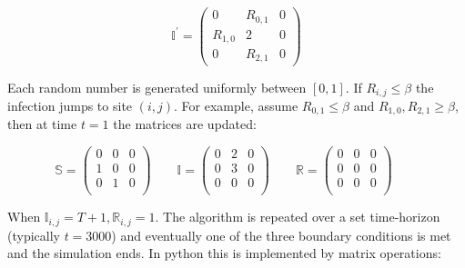 \begin{equation}
    \mathbb{I}^{'} = \begin{pmatrix}
        0 & R_{0,1} & 0 \\
        R_{1,0} & 2 & 0 \\
        0 & R_{2,1} & 0 
     \end{pmatrix}
\end{equation}

Each random number is generated uniformly between $[0,1] $. If  $R_{i,j} \leqslant \beta$ the infection jumps to site $(i,j)$. For example, assume $R_{0,1}\leqslant \beta$ and $R_{1,0}, R_{2,1} \geq \beta $, then at time $t=1$ the matrices are updated:

\begin{equation}
    \mathbb{S} = \left( \begin{array}{ccc}
    0 & 0 & 0\\
    1 & 0 & 0\\
    0& 1 & 0 \\
    \end{array} \right)\qquad
    \mathbb{I}= \left( \begin{array}{ccc}
    0 & 2 & 0\\
    0 & 3 & 0\\
    0& 0 & 0 \\
    \end{array} \right)\qquad
    \mathbb{R}= \left( \begin{array}{ccc}
    0 & 0 & 0\\
    0 & 0 & 0\\
    0 & 0 & 0\\
    \end{array} \right)\qquad
\end{equation}
    
When $\mathbb{I}_{i,j}=T+1, \mathbb{R}_{i,j} = 1$. The algorithm is repeated over a set time-horizon (typically $t=3000$) and eventually one of the three boundary conditions is met and the simulation ends. In python this is implemented by matrix operations:

